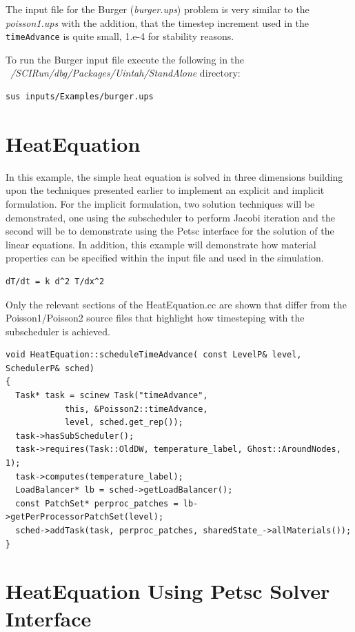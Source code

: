 \documentclass[12pt]{report}
\begin{document}
The input file for the Burger (\emph{burger.ups}) problem is very
similar to the \emph{poisson1.ups} with the addition, that the
timestep increment used in the \texttt{timeAdvance} is quite small,
1.e-4 for stability reasons.

To run the Burger input file execute the following in the
\emph{~/SCIRun/dbg/Packages/Uintah/StandAlone} directory:

\begin{Verbatim}[fontsize=\footnotesize]
	sus inputs/Examples/burger.ups
\end{Verbatim}

\section{HeatEquation}

In this example, the simple heat equation is solved in three
dimensions building upon the techniques presented earlier to implement
an explicit and implicit formulation.  For the implicit formulation,
two solution techniques will be demonstrated, one using the
subscheduler to perform Jacobi iteration and the second will be to
demonstrate using the Petsc interface for the solution of the linear
equations.  In addition, this example will demonstrate how material
properties can be specified within the input file and used in the
simulation.

\begin{Verbatim}[fontsize=\footnotesize]
	dT/dt = k d^2 T/dx^2  
\end{Verbatim}

Only the relevant sections of the HeatEquation.cc are shown that
differ from the Poisson1/Poisson2 source files that highlight how
timesteping with the subscheduler is achieved.

\begin{Verbatim}[fontsize=\footnotesize]
void HeatEquation::scheduleTimeAdvance( const LevelP& level, SchedulerP& sched)
{
  Task* task = scinew Task("timeAdvance",
			this, &Poisson2::timeAdvance,
			level, sched.get_rep());
  task->hasSubScheduler();
  task->requires(Task::OldDW, temperature_label, Ghost::AroundNodes, 1);
  task->computes(temperature_label);
  LoadBalancer* lb = sched->getLoadBalancer();
  const PatchSet* perproc_patches = lb->getPerProcessorPatchSet(level);
  sched->addTask(task, perproc_patches, sharedState_->allMaterials());
}

\end{Verbatim}

\section{HeatEquation Using Petsc Solver Interface}
\end{document}
